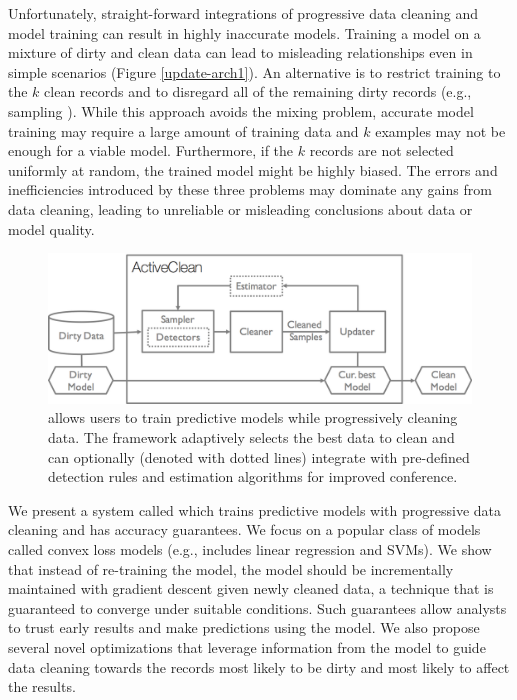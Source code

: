 Unfortunately, straight-forward integrations of progressive data cleaning and model training can result in highly inaccurate models.
Training a model on a mixture of dirty and clean data can lead to misleading relationships even in simple scenarios (Figure \ref{update-arch1}).
An alternative is to restrict training to the $k$ clean records and to disregard all of the remaining dirty records (e.g., sampling \cite{wang1999sample}).
While this approach avoids the mixing problem, accurate model training may require a large amount of training data and $k$ examples may not be enough for a viable model.
Furthermore, if the $k$ records are not selected uniformly at random, the trained model might be highly biased.
The errors and inefficiencies introduced by these three problems may dominate any gains from data cleaning, leading to unreliable or misleading conclusions about data or model quality.

\begin{figure}[t]
\centering
 \includegraphics[width=\columnwidth]{figs/arch.png}
 \caption{\sysfull allows users to train predictive models while progressively cleaning data. The framework adaptively selects the best data to clean and can optionally (denoted with dotted lines) integrate with pre-defined detection rules and estimation algorithms for improved conference. \label{sys-arch}}\vspace{-2em}
\end{figure}

We present a system called \sys which trains predictive models with progressive data cleaning and has accuracy guarantees.
We focus on a popular class of models called convex loss models (e.g., includes linear regression and SVMs).
We show that instead of re-training the model, the model should be incrementally maintained with gradient descent given newly cleaned data, a technique that is guaranteed to converge under suitable conditions.
Such guarantees allow analysts to trust early results and make predictions using the model.
We also propose several novel optimizations that leverage information from the model to guide data cleaning towards the records most likely to be dirty and most likely to affect the results.

